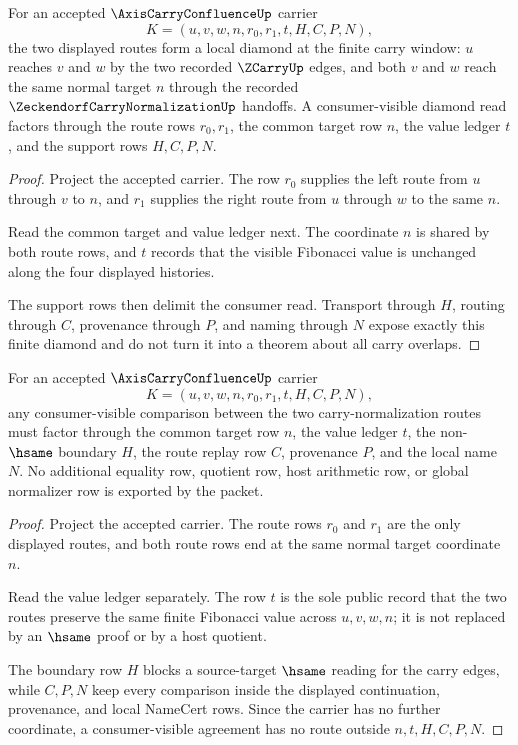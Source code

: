 \begin{theorem}
\label{thm:axis-carry-confluence-local-diamond}
For an accepted $\AxisCarryConfluenceUp$ carrier
$$
K=(u,v,w,n,r_0,r_1,t,H,C,P,N),
$$
the two displayed routes form a local diamond at the finite carry window: $u$ reaches $v$ and $w$ by the two recorded $\ZCarryUp$ edges, and both $v$ and $w$ reach the same normal target $n$ through the recorded $\ZeckendorfCarryNormalizationUp$ handoffs. A consumer-visible diamond read factors through the route rows $r_0,r_1$, the common target row $n$, the value ledger $t$, and the support rows $H,C,P,N$.
\end{theorem}
\begin{proof}
Project the accepted carrier. The row $r_0$ supplies the left route from $u$ through $v$ to $n$, and $r_1$ supplies the right route from $u$ through $w$ to the same $n$.

Read the common target and value ledger next. The coordinate $n$ is shared by both route rows, and $t$ records that the visible Fibonacci value is unchanged along the four displayed histories.

The support rows then delimit the consumer read. Transport through $H$, routing through $C$, provenance through $P$, and naming through $N$ expose exactly this finite diamond and do not turn it into a theorem about all carry overlaps.
\end{proof}

\begin{theorem}
\label{thm:axis-carry-confluence-value-ledger-exhaustion}
For an accepted $\AxisCarryConfluenceUp$ carrier
$$
K=(u,v,w,n,r_0,r_1,t,H,C,P,N),
$$
any consumer-visible comparison between the two carry-normalization routes must factor through the common target row $n$, the value ledger $t$, the non-$\hsame$ boundary $H$, the route replay row $C$, provenance $P$, and the local name $N$. No additional equality row, quotient row, host arithmetic row, or global normalizer row is exported by the packet.
\end{theorem}
\begin{proof}
Project the accepted carrier. The route rows $r_0$ and $r_1$ are the only displayed routes, and both route rows end at the same normal target coordinate $n$.

Read the value ledger separately. The row $t$ is the sole public record that the two routes preserve the same finite Fibonacci value across $u,v,w,n$; it is not replaced by an $\hsame$ proof or by a host quotient.

The boundary row $H$ blocks a source-target $\hsame$ reading for the carry edges, while $C,P,N$ keep every comparison inside the displayed continuation, provenance, and local NameCert rows. Since the carrier has no further coordinate, a consumer-visible agreement has no route outside $n,t,H,C,P,N$.
\end{proof}

